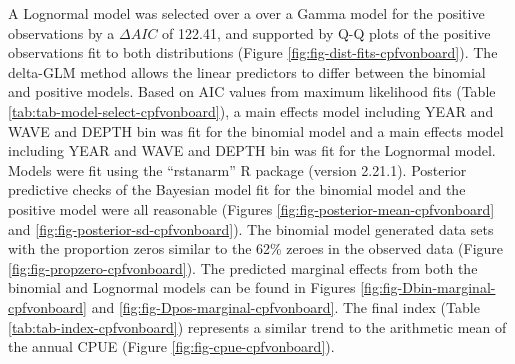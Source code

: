 \documentclass[11pt,
  english,
]{article}
\begin{document}
A Lognormal model was selected over a over a Gamma model for the positive observations by a {\(\Delta AIC\)\leavevmode\tagmcend\tagstructend} of 122.41, and supported by Q-Q plots of the positive observations fit to both distributions (Figure \ref{fig:fig-dist-fits-cpfvonboard}). The delta-GLM method allows the linear predictors to differ between the binomial and positive models. Based on AIC values from maximum likelihood fits (Table \ref{tab:tab-model-select-cpfvonboard}), a main effects model including YEAR and WAVE and DEPTH bin was fit for the binomial model and a main effects model including YEAR and WAVE and DEPTH bin was fit for the Lognormal model. Models were fit using the ``rstanarm'' R package (version 2.21.1). Posterior predictive checks of the Bayesian model fit for the binomial model and the positive model were all reasonable (Figures \ref{fig:fig-posterior-mean-cpfvonboard} and \ref{fig:fig-posterior-sd-cpfvonboard}). The binomial model generated data sets with the proportion zeros similar to the 62\% zeroes in the observed data (Figure \ref{fig:fig-propzero-cpfvonboard}). The predicted marginal effects from both the binomial and Lognormal models can be found in Figures \ref{fig:fig-Dbin-marginal-cpfvonboard} and \ref{fig:fig-Dpos-marginal-cpfvonboard}. The final index (Table \ref{tab:tab-index-cpfvonboard}) represents a similar trend to the arithmetic mean of the annual CPUE (Figure \ref{fig:fig-cpue-cpfvonboard}).

\FloatBarrier
\end{document}
